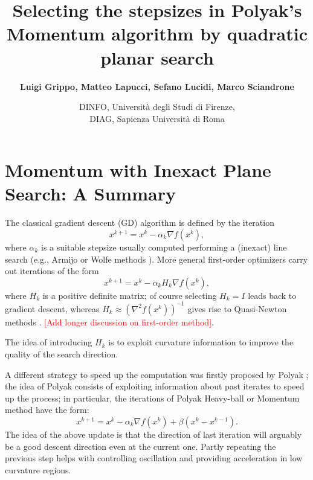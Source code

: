 \documentclass[a4paper, 11pt, openany]{article}
\theoremstyle{plain}%
\theoremstyle{definition}
\begin{document}
	\title{Selecting the stepsizes in Polyak's Momentum algorithm by quadratic planar search}
	
	\author{
		\textbf{Luigi Grippo, Matteo Lapucci, Sefano Lucidi, Marco Sciandrone}
	}
	\date{DINFO, Universit\`{a} degli Studi di Firenze,\\DIAG, Sapienza Università di Roma}
	\maketitle
	\thispagestyle{empty}
	
%	
	
	\section{Momentum with Inexact Plane Search: A Summary}
	The classical gradient descent (GD) algorithm is defined by the iteration
	$$x^{k+1} = x^k-\alpha_k \nabla f(x^k),$$
	where $\alpha_k$ is a suitable stepsize usually computed performing a (inexact) line search (e.g., Armijo or Wolfe methods \cite{bertsekas1997nonlinear}). More general first-order optimizers carry out iterations of the form
	\begin{equation}
		\label{eq:first_order_update}
		x^{k+1} = x^k-\alpha_k H_k\nabla f(x^k),
	\end{equation}
	where $H_k$ is a positive definite matrix; of course selecting $H_k=I$ leads back to  gradient descent, whereas $H_k \approx (\nabla^2f(x^k))^{-1}$ gives rise to Quasi-Newton methods \cite{bertsekas1997nonlinear}. \textcolor{red}{[Add longer discussion on first-order method]}. 
	
	The idea of introducing $H_k$ is to exploit curvature information to improve the quality of the search direction.
	
	A different strategy to speed up the computation was firstly proposed by Polyak \cite{polyak1964some}; the idea of Polyak consists of exploiting information about past iterates to speed up the process; in particular, the iterations of Polyak Heavy-ball or Momentum method have the form:
	\begin{equation}
		\label{eq:momentum_update}
	\end{equation}
	$$x^{k+1} = x^k -\alpha_k \nabla f(x^k) + \beta (x^{k}-x^{k-1}).$$
	The idea of the above update is that the direction of last iteration will arguably be a good descent direction even at the current one. Partly repeating the previous step helps with controlling oscillation and providing acceleration in low curvature regions.
	
\end{document}

